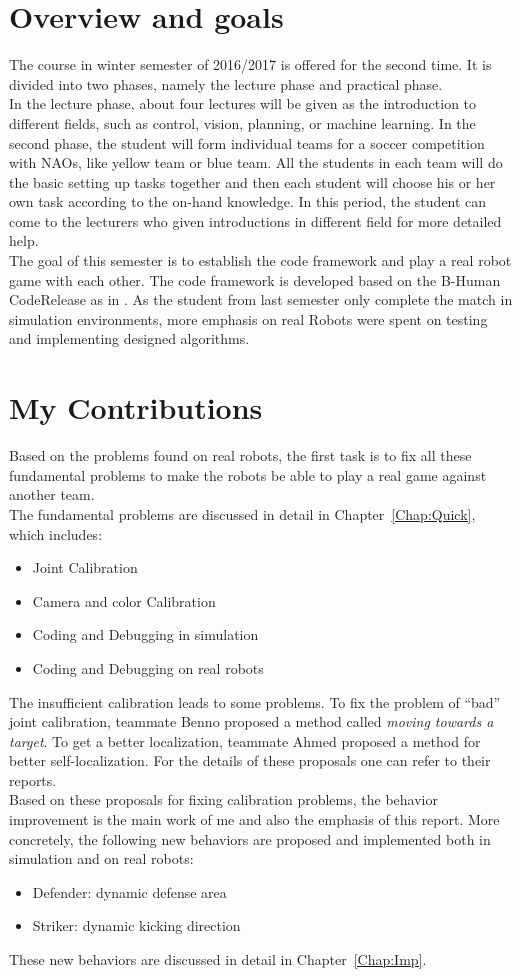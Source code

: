 \section{Overview and goals}
The course in winter semester of 2016/2017 is offered for the second time. It is divided into two phases, namely the lecture phase and practical phase. \\
In the lecture phase, about four lectures will be given as the introduction to different fields, such as control, vision, planning, or machine learning. In the second phase, the student will form individual teams for a soccer competition with NAOs, like yellow team or blue team. All the students in each team will do the basic setting up tasks together and then each student will choose his or her own task according to the on-hand knowledge. In this period, the student can come to the lecturers who given introductions in different field for more detailed help. \\
The goal of this semester is to establish the code framework and play a real robot game with each other. The code framework is developed based on the B-Human CodeRelease as in \cite{BHumanCodeRelease2015}. As the student from last semester only complete the match in simulation environments, more emphasis on real Robots were spent on testing and implementing designed algorithms.
\section{My Contributions}
Based on the problems found on real robots, the first task is to fix all these fundamental problems to make the robots be able to play a real game against another team.\\
The fundamental problems are discussed in detail in Chapter~\ref{Chap:Quick}, which includes:
\begin{itemize}
    \item Joint Calibration
    \item Camera and color Calibration
    \item Coding and Debugging in simulation
    \item Coding and Debugging on real robots
\end{itemize}
The insufficient calibration leads to some problems. To fix the problem of ``bad'' joint calibration, teammate Benno proposed a method called \textit{moving towards a target}. To get a better localization, teammate Ahmed proposed a method for better self-localization. For the details of these proposals one can refer to their reports. \\
Based on these proposals for fixing calibration problems, the behavior improvement is the main work of me and also the emphasis of this report. More concretely, the following new behaviors are proposed and implemented both in simulation and on real robots:
\begin{itemize}
    \item Defender: dynamic defense area
    \item Striker: dynamic kicking direction
\end{itemize}
These new behaviors are discussed in detail in Chapter~\ref{Chap:Imp}.
